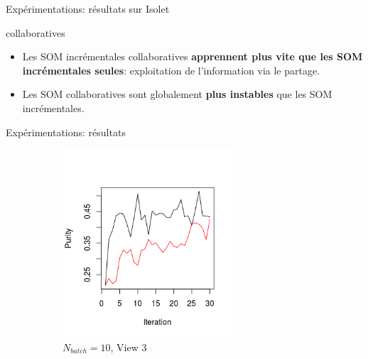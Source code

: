 \documentclass[hyperref={pdfpagelabels=false}]{beamer}
\begin{document}
\begin{frame}{Expérimentations: résultats sur Isolet}
\begin{center}
{                collaboratives}
            \end{center}
            \begin{itemize}
                \item Les SOM incrémentales collaboratives \textbf{apprennent 
                    plus vite que les SOM incrémentales seules}:                 
                    exploitation de l'information via le partage.
                \item Les SOM collaboratives sont globalement \textbf{plus 
                    instables} que les SOM incrémentales.
            \end{itemize}
        \end{frame}

        \begin{frame}{Expérimentations: résultats}
            \begin{figure}[!h]
                \centering
                \begin{subfigure}[b]{0.3\textwidth}
                    \centering
                    \includegraphics[width=0.7\textwidth, trim= 0cm 0.5cm 1cm 2cm, clip]{img/33.png}
                    \caption{$N_{batch}=10$, View 3}
                \end{subfigure}
                \begin{subfigure}[b]{0.3\textwidth}
                    \centering

\end{subfigure}
\end{figure}
\end{frame}
\end{document}
